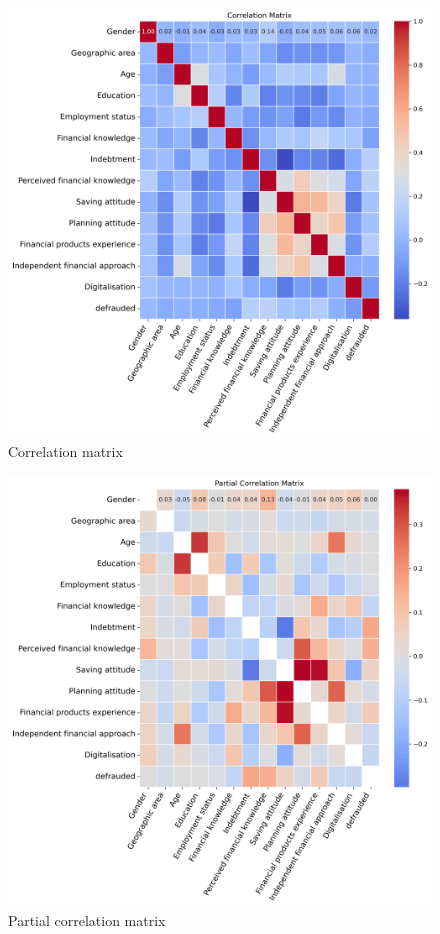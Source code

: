 \documentclass[a4paper,11pt]{article}
\begin{document}
\vspace{0.8cm}

\begin{figure}[H]
  \centering
        \includegraphics[width=13.85cm]{Corrplot.png}
 \caption{Correlation matrix}
 \label{corr}
\end{figure}

\begin{figure}[H]
  \centering
        \includegraphics[width=13.85cm]{parcorrplot.png}
 \caption{ Partial correlation matrix}
 \label{parcorr}
\end{figure}
\end{document}
